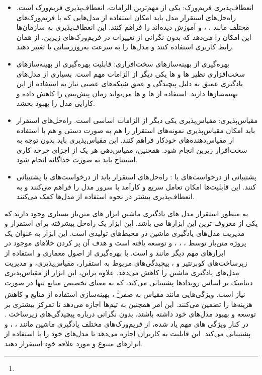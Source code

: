 \begin{itemize}
	\item 
	انعطاف‌پذیری فریم‌ورک:
	یکی از مهم‌ترین الزامات، انعطاف‌پذیری فریم‌ورک است. راه‌حل‌های استقرار مدل باید امکان استفاده از مدل‌هایی که با فریم‌ورک‌های مختلف مانند ، ، و  آموزش دیده‌اند را فراهم کنند. این انعطاف‌پذیری به سازمان‌ها این امکان را می‌دهد که بدون نگرانی از تغییرات در فریم‌ورک‌های زیرین، از همان رابط کاربری استفاده کنند و مدل‌ها را به سرعت به‌روزرسانی یا تغییر دهند.
	\item 
	بهره‌گیری از بهینه‌سازهای سخت‌افزاری:
	قابلیت بهره‌گیری از بهینه‌سازهای سخت‌افزاری نظیر ها و ها یکی دیگر از الزامات مهم است. بسیاری از مدل‌های یادگیری عمیق به دلیل پیچیدگی و عمق شبکه‌های عصبی نیاز به استفاده از این بهینه‌سازها دارند. استفاده از ها و ها می‌تواند زمان پیش‌بینی را کاهش داده و کارایی مدل را بهبود بخشد.
	\item
	مقیاس‌پذیری:
	مقیاس‌پذیری یکی دیگر از الزامات اساسی است. راه‌حل‌های استقرار باید امکان مقیاس‌پذیری نمونه‌های استقرار را هم به صورت دستی و هم با استفاده از مقیاس‌دهنده‌های خودکار فراهم کنند. این مقیاس‌پذیری باید بدون توجه به سخت‌افزار زیرین انجام شود. همچنین، مقیاس‌دهی هر یک از اجزای چرخه کاری استنتاج باید به صورت جداگانه انجام شود.
	\item 
	پشتیبانی از درخواست‌های  یا :
	راه‌حل‌های استقرار باید از درخواست‌های  یا  پشتیبانی کنند. این قابلیت‌ها امکان تعامل سریع و کارآمد با سرور مدل را فراهم می‌کنند و به انعطاف‌پذیری بیشتر در نحوه استفاده از مدل‌ها کمک می‌کنند. 
\end{itemize}

به منظور استقرار مدل های یادگیری ماشین ابزار های متن‌باز بسیاری وجود دارند که یکی از معروف ترین این ابزارها  می باشد. این ابزار یک راه‌حل پیشرفته برای استقرار و مدیریت مدل‌های یادگیری ماشین در محیط‌های تولیدی است. این ابزار به عنوان یک پروژه متن‌باز توسط ، ، ، و  توسعه یافته است و هدف آن پر کردن خلاهای موجود در ابزارهای مهم دیگر مانند  و  است.  با بهره‌گیری از اصول معماری  و استفاده از زیرساخت‌های کوبرنتیر و ، پیچیدگی‌های مربوط به استقرار، مقیاس‌پذیری، و مدیریت مدل‌های یادگیری ماشین را کاهش می‌دهد. علاوه براین،‌ این ابزار از مقیاس‌پذیری دینامیک بر اساس رویدادها پشتیبانی می‌کند، که به معنای تخصیص منابع تنها در صورت نیاز است. ویژگی‌هایی مانند مقیاس به صفر\footnote{} ، بهینه‌سازی استفاده از منابع و کاهش هزینه‌ها را تضمین می‌کنند. این امر همچنین به تیم‌ها اجازه می‌دهد تا تمرکز بیشتری بر توسعه و بهبود مدل‌های خود داشته باشند، بدون نگرانی درباره پیچیدگی‌های زیرساخت \cite{KServe}.
در کنار ویژگی های مهم یاد شده،‌  از فریم‌ورک‌های مختلف یادگیری ماشین مانند ، ، و  پشتیبانی می‌کند. این قابلیت به کاربران اجازه می‌دهد تا مدل‌های خود را با استفاده از ابزارهای متنوع و مورد علاقه خود استقرار دهند. 

